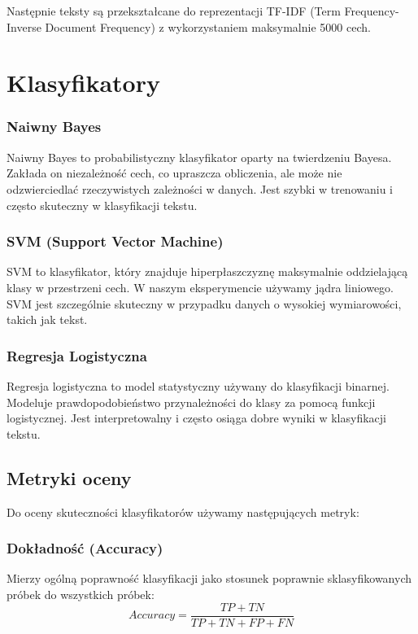 \documentclass[runningheads]{llncs}
\begin{document}
Następnie teksty są przekształcane do reprezentacji TF-IDF (Term Frequency-Inverse Document Frequency) z wykorzystaniem maksymalnie 5000 cech.

\section{Klasyfikatory}

\subsubsection{Naiwny Bayes}
Naiwny Bayes to probabilistyczny klasyfikator oparty na twierdzeniu Bayesa. Zakłada on niezależność cech, co upraszcza obliczenia, ale może nie odzwierciedlać rzeczywistych zależności w danych. Jest szybki w trenowaniu i często skuteczny w klasyfikacji tekstu.

\subsubsection{SVM (Support Vector Machine)}
SVM to klasyfikator, który znajduje hiperpłaszczyznę maksymalnie oddzielającą klasy w przestrzeni cech. W naszym eksperymencie używamy jądra liniowego. SVM jest szczególnie skuteczny w przypadku danych o wysokiej wymiarowości, takich jak tekst.

\subsubsection{Regresja Logistyczna}
Regresja logistyczna to model statystyczny używany do klasyfikacji binarnej. Modeluje prawdopodobieństwo przynależności do klasy za pomocą funkcji logistycznej. Jest interpretowalny i często osiąga dobre wyniki w klasyfikacji tekstu.

\subsection{Metryki oceny}
Do oceny skuteczności klasyfikatorów używamy następujących metryk:

\subsubsection{Dokładność (Accuracy)}
Mierzy ogólną poprawność klasyfikacji jako stosunek poprawnie sklasyfikowanych próbek do wszystkich próbek:
\begin{equation}
    Accuracy = \frac{TP + TN}{TP + TN + FP + FN}
\end{equation}
\end{document}
